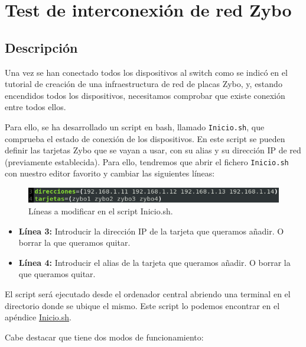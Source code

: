 \section{Test de interconexión de red Zybo}
\hypertarget{TestConexion}{}
\subsection{Descripción}
Una vez se han conectado todos los dispositivos al switch como se indicó en el tutorial de creación de una infraestructura de red de placas Zybo, y, estando encendidos todos los dispositivos, necesitamos comprobar que existe conexión entre todos ellos.

Para ello, se ha desarrollado un script en bash, llamado \texttt{Inicio.sh}, que comprueba el estado de conexión de los dispositivos. En este script se pueden definir las tarjetas Zybo que se vayan a usar, con su alias y su dirección IP de red (previamente establecida). Para ello, tendremos que abrir el fichero \texttt{Inicio.sh} con nuestro editor favorito y cambiar las siguientes líneas:
\begin{figure}[h]
	\centering
	\includegraphics[scale=0.9]{Anexos/Anexo2/Test/Script.png}
	\caption{Líneas a modificar en el script Inicio.sh.}
	\label{Líneas a modificar en el script Inicio.sh}
\end{figure}
\begin{itemize}
	\item \textbf{Línea 3:} Introducir la dirección IP de la tarjeta que queramos añadir. O borrar la que queramos quitar.
	\item \textbf{Línea 4:} Introducir el alias de la tarjeta que queramos añadir. O borrar la que queramos quitar.
\end{itemize}

El script será ejecutado desde el ordenador central abriendo una terminal en el directorio donde se ubique el mismo. Este script lo podemos encontrar en el apéndice \hyperlink{ScriptConexion}{Inicio.sh}.

Cabe destacar que tiene dos modos de funcionamiento:
